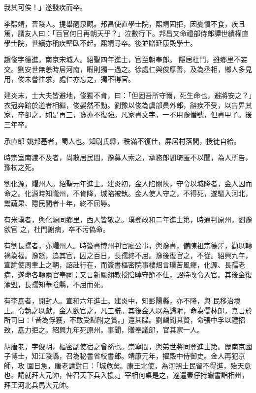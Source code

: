 \begin{pinyinscope}
 我其可俟！」遂發疾而卒。



 李熙靖，晉陵人。提舉醴泉觀。邦昌使直學士院，熙靖固拒，因憂憤不食，疾且篤，謂友人曰：「百官何日再朝天乎？」泣數行下。邦昌又命禮部侍郎譚世績權直學士院，世績亦稱疾堅臥不起。熙靖尋卒。後並贈延康殿學士。



 趙俊字德進，南京宋城人。紹聖四年進士，官至朝奉郎。
 隱居杜門，雖鄉里不妄交。劉安世無恙時居河南，暇則獨一過之。徐處仁與俊厚善，及為丞相，鄉人多見用，俊未嘗往求，處仁亦忘之，獨不得官。



 建炎末，士大夫皆避地，俊獨不肯，曰：「但固吾所守爾，死生命也，避將安之？」衣冠奔踣於道者相繼，俊晏然不動。劉豫以俊為虞部員外郎，辭疾不受，以告畀其家，卒卻之，如是再三，豫亦不復強。凡家書文字，一不用豫僭號，但書甲子。後三年卒。



 承直郎
 姚邦基者，蜀人也。知尉氏縣，秩滿不復仕，屏居村落間，授徒自給。



 時宗室南渡不及者，尚散居民間，豫募人索之，承務郎閻琦匿不以聞，為人所告，豫杖之死。



 劉化源，耀州人。紹聖元年進士。建炎初，金人陷關陜，守令以城降者，金人因而命之。化源時知隴州，不肯降，城陷被執。金人使人守之，不得死，遂驅入河北，鬻蔬果、隱民間者十年，終不屈辱。



 有米璞者，與化源同鄉里，西人皆敬之。璞登政和二年進士第，時通判原州，劉豫欲官
 之，杜門謝病，卒不污偽命。



 有劉長孺者，亦耀州人。時簽書博州判官廳公事，與豫書，備陳祖宗德澤，勸以轉禍為福。豫怒，追其官，囚之百日，長孺終不屈。豫後復官之，不從。紹興九年，宣諭使周聿上之朝，詔赴行在，而簽書樞密院事樓炤言璞苦風痺，化源、長孺老病，遂命各轉兩官奉祠；又言新鳳翔教授陰晫守節不仕，詔特改令入官。其後金復渝盟，長孺知華陰縣，不屈而死。



 有李嚞者，開封人。宣和六年進士。建炎中，知彭陽縣，亦不降，與
 民移治境上。令執之以獻，金人欲官之，凡三辭。其後金人以為歸附，命為儒林郎，嚞言於所司曰：「昔為俘獲，不敢受歸附之賞。」還其牒。劉麟聞其賢，命張中孚以禮招致，嚞力拒之。紹興九年死原州。事聞，贈奉議郎，官其家一人。



 胡唐老，字俊明，樞密副使宿之曾孫也。崇寧間，與弟世將同登進士第。歷南京國子博士，知江陵縣，召為秘書省校書郎。靖康元年，擢殿中侍御史。金人再犯京師，攻
 圍日急，唐老請對曰：「城危矣。康王北使，為河朔士民留不得進，殆天意也。請就拜大元帥，俾召天下兵入援。」宰相何㮚是之，遂遣秦仔持蠟書詣相州，拜王河北兵馬大元帥。




\end{pinyinscope}
